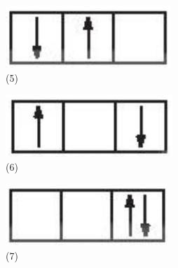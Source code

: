 \documentclass[10pt]{article}
\begin{document}
\begin{figure}[h]
\begin{center}
  \includegraphics[width=\textwidth]{2025_10_23_ee735750217b2aca435cg-03(6)}
\captionsetup{labelformat=empty}
\caption{(5)}
\end{center}
\end{figure}

\begin{figure}[h]
\begin{center}
  \includegraphics[width=\textwidth]{2025_10_23_ee735750217b2aca435cg-03(5)}
\captionsetup{labelformat=empty}
\caption{(6)}
\end{center}
\end{figure}

\begin{figure}[h]
\begin{center}
  \includegraphics[width=\textwidth]{2025_10_23_ee735750217b2aca435cg-03(7)}
\captionsetup{labelformat=empty}
\caption{(7)}
\end{center}
\end{figure}
\end{document}
